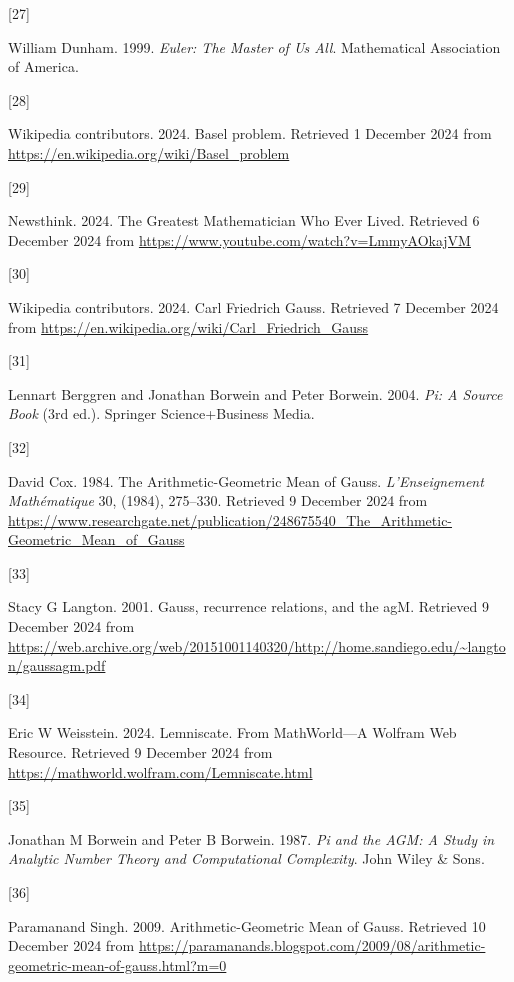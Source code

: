 \documentclass[
  a4paper,
]{article}
\newlength{\cslhangindent}
\newlength{\csllabelwidth}
\newenvironment{CSLReferences}[2] %
 {\begin{list}{}{%
  \setlength{\itemindent}{0pt}
  \setlength{\leftmargin}{0pt}
  \setlength{\parsep}{0pt}
  \ifodd #1
   \setlength{\leftmargin}{\cslhangindent}
   \setlength{\itemindent}{-1\cslhangindent}
  \fi
  \setlength{\itemsep}{#2\baselineskip}}}
 {\end{list}}
\newcommand{\CSLLeftMargin}[1]{\parbox[t]{\csllabelwidth}{\strut#1\strut}}
\newcommand{\CSLRightInline}[1]{\parbox[t]{\linewidth - \csllabelwidth}{\strut#1\strut}}
\begin{document}
\begin{CSLReferences}{0}{0}
\CSLLeftMargin{{[}27{]} }%
\CSLRightInline{William Dunham. 1999. \emph{{Euler: The Master of Us
All}}. Mathematical Association of America.}

\CSLLeftMargin{{[}28{]} }%
\CSLRightInline{Wikipedia contributors. 2024. {Basel problem}. Retrieved
1 December 2024 from \url{https://en.wikipedia.org/wiki/Basel_problem}}

\CSLLeftMargin{{[}29{]} }%
\CSLRightInline{Newsthink. 2024. {The Greatest Mathematician Who Ever
Lived}. Retrieved 6 December 2024 from
\url{https://www.youtube.com/watch?v=LmmyAOkajVM}}

\CSLLeftMargin{{[}30{]} }%
\CSLRightInline{Wikipedia contributors. 2024. {Carl Friedrich Gauss}.
Retrieved 7 December 2024 from
\url{https://en.wikipedia.org/wiki/Carl_Friedrich_Gauss}}

\CSLLeftMargin{{[}31{]} }%
\CSLRightInline{Lennart Berggren and Jonathan Borwein and Peter Borwein.
2004. \emph{{Pi: A Source Book}} (3rd ed.). Springer Science+Business
Media.}

\CSLLeftMargin{{[}32{]} }%
\CSLRightInline{David Cox. 1984. {The Arithmetic-Geometric Mean of
Gauss}. \emph{L'Enseignement Mathématique} 30, (1984), 275--330.
Retrieved 9 December 2024 from
\url{https://www.researchgate.net/publication/248675540_The_Arithmetic-Geometric_Mean_of_Gauss}}

\CSLLeftMargin{{[}33{]} }%
\CSLRightInline{Stacy G Langton. 2001. {Gauss, recurrence relations, and
the agM}. Retrieved 9 December 2024 from
\url{https://web.archive.org/web/20151001140320/http://home.sandiego.edu/~langton/gaussagm.pdf}}

\CSLLeftMargin{{[}34{]} }%
\CSLRightInline{Eric W Weisstein. 2024. {Lemniscate}. {From
MathWorld---A Wolfram Web Resource}. Retrieved 9 December 2024 from
\url{https://mathworld.wolfram.com/Lemniscate.html}}

\CSLLeftMargin{{[}35{]} }%
\CSLRightInline{Jonathan M Borwein and Peter B Borwein. 1987. \emph{{Pi
and the AGM}: {A Study in Analytic Number Theory and Computational
Complexity}}. John Wiley \& Sons.}

\CSLLeftMargin{{[}36{]} }%
\CSLRightInline{Paramanand Singh. 2009. {Arithmetic-Geometric Mean of
Gauss}. Retrieved 10 December 2024 from
\url{https://paramanands.blogspot.com/2009/08/arithmetic-geometric-mean-of-gauss.html?m=0}}


\end{CSLReferences}
\end{document}

